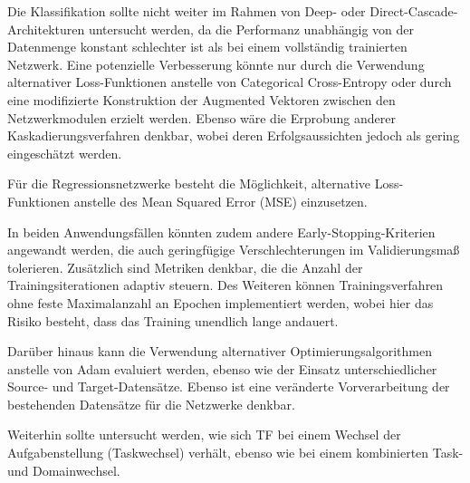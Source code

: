 Die Klassifikation sollte nicht weiter im Rahmen von Deep- oder Direct-Cascade-Architekturen untersucht werden, da die Performanz unabhängig von 
der Datenmenge konstant schlechter ist als bei einem vollständig trainierten Netzwerk. Eine potenzielle Verbesserung könnte nur durch die 
Verwendung alternativer Loss-Funktionen anstelle von Categorical Cross-Entropy oder durch eine modifizierte Konstruktion der Augmented Vektoren 
zwischen den Netzwerkmodulen erzielt werden. Ebenso wäre die Erprobung anderer Kaskadierungsverfahren denkbar, wobei deren Erfolgsaussichten 
jedoch als gering eingeschätzt werden.

Für die Regressionsnetzwerke besteht die Möglichkeit, alternative Loss-Funktionen anstelle des Mean Squared Error (MSE) einzusetzen.

In beiden Anwendungsfällen könnten zudem andere Early-Stopping-Kriterien angewandt werden, die auch geringfügige Verschlechterungen im 
Validierungsmaß tolerieren. Zusätzlich sind Metriken denkbar, die die Anzahl der Trainingsiterationen adaptiv steuern. Des Weiteren können 
Trainingsverfahren ohne feste Maximalanzahl an Epochen implementiert werden, wobei hier das Risiko besteht, dass das Training unendlich lange 
andauert.

Darüber hinaus kann die Verwendung alternativer Optimierungsalgorithmen anstelle von Adam evaluiert werden, ebenso wie der Einsatz 
unterschiedlicher Source- und Target-Datensätze. Ebenso ist eine veränderte Vorverarbeitung der bestehenden Datensätze für die Netzwerke 
denkbar.

Weiterhin sollte untersucht werden, wie sich TF bei einem Wechsel der Aufgabenstellung (Taskwechsel) verhält, ebenso wie bei einem 
kombinierten Task- und Domainwechsel.
